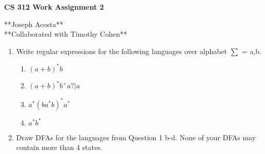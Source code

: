 \documentclass[11pt]{article}
\begin{document}
\begin{center}             %
\begin{LARGE}
{\bf CS 312 Work Assignment 2}
\end{LARGE}
\vskip 0.25cm      %

**Joseph Acosta**\\
**Collaborated with Timothy Cohen**\\
\end{center}

\begin{enumerate}

\item Write regular expressions for the following languages over alphabet $\sum$ = {a,b}.
\begin{enumerate}
\item $(a+b)^*b\hspace{12pt}$\\
\item $(a+b)^*b^+a?|a$\\
\item $a^*(ba^*b)^*a^*$\\
\item $a^*b^*$\\
\end{enumerate}

\item Draw DFAs for the languages from Question 1 b-d. None of your DFAs
may contain more than 4 states.
\\
\\
\\
\\
\\
\\
\\
\\
\\
\\
\\
\\\\
\\
\\
\\
\\
\\
\\\\
\\
\\
\\
\\
\\
\\
\\
\\
\\
\\


\end{enumerate}
\end{document}
